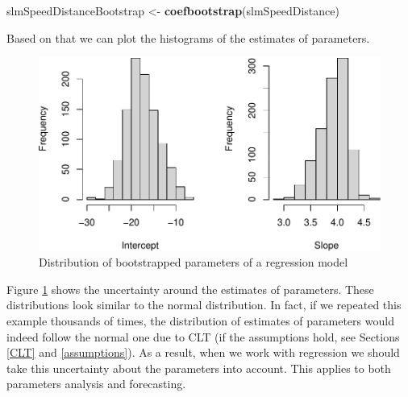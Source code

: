 \documentclass[
]{book}
\newenvironment{Shaded}{\begin{snugshade}}{\end{snugshade}}
\newcommand{\DataTypeTok}[1]{\textcolor[rgb]{0.13,0.29,0.53}{#1}}
\newcommand{\DecValTok}[1]{\textcolor[rgb]{0.00,0.00,0.81}{#1}}
\newcommand{\KeywordTok}[1]{\textcolor[rgb]{0.13,0.29,0.53}{\textbf{#1}}}
\newcommand{\NormalTok}[1]{#1}
\newcommand{\OperatorTok}[1]{\textcolor[rgb]{0.81,0.36,0.00}{\textbf{#1}}}
\newcommand{\StringTok}[1]{\textcolor[rgb]{0.31,0.60,0.02}{#1}}
\theoremstyle{definition}
\theoremstyle{definition}
\theoremstyle{definition}
\theoremstyle{definition}
\theoremstyle{remark}
\begin{document}
\begin{Shaded}
\begin{Highlighting}[]
\NormalTok{slmSpeedDistanceBootstrap \textless{}{-}}\StringTok{ }\KeywordTok{coefbootstrap}\NormalTok{(slmSpeedDistance)}
\end{Highlighting}
\end{Shaded}

Based on that we can plot the histograms of the estimates of parameters.

\begin{Shaded}
\end{Shaded}

\begin{figure}
\centering
\includegraphics{Svetunkov---Statistics-for-Business-Analytics_files/figure-latex/slmSpeedDistanceBoot-1.pdf}
\caption{\label{fig:slmSpeedDistanceBoot}Distribution of bootstrapped parameters of a regression model}
\end{figure}

Figure \ref{fig:slmSpeedDistanceBoot} shows the uncertainty around the estimates of parameters. These distributions look similar to the normal distribution. In fact, if we repeated this example thousands of times, the distribution of estimates of parameters would indeed follow the normal one due to CLT (if the assumptions hold, see Sections \ref{CLT} and \ref{assumptions}). As a result, when we work with regression we should take this uncertainty about the parameters into account. This applies to both parameters analysis and forecasting.
\end{document}
